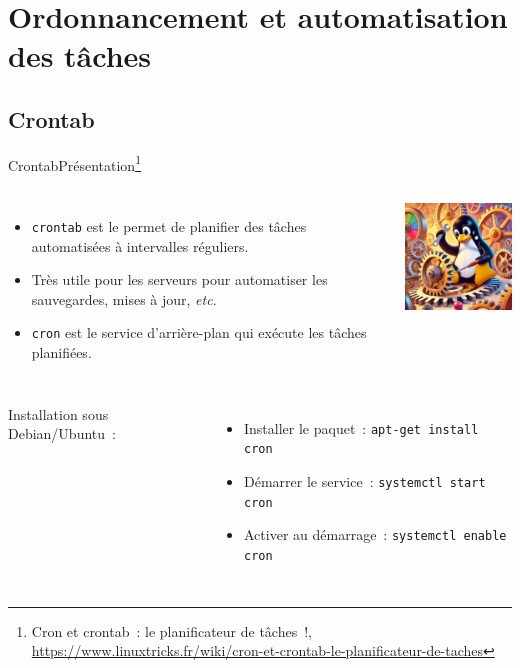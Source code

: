 \documentclass{beamer}
\begin{document}
    \section{Ordonnancement et automatisation des tâches}\label{sec:scheduling}

    \subsection{Crontab}\label{subsec:crontab}

    \begin{frame}{Crontab}{Présentation\footnote{\label{linuxtricks-cron}Cron et crontab~: le planificateur de tâches~!, \url{https://www.linuxtricks.fr/wiki/cron-et-crontab-le-planificateur-de-taches}}}
        \begin{columns}
            \begin{itemize}
                \item \lstinline{crontab} est le permet de planifier des tâches automatisées à intervalles réguliers.
                \item Très utile pour les serveurs pour automatiser les sauvegardes, mises à jour, \textit{etc}.
                \item \lstinline{cron} est le service d'arrière-plan qui exécute les tâches planifiées.
            \end{itemize}
            \includegraphics[width=4cm]{image/pinguin-clockwork}
        \end{columns}
        \bigbreak
        \begin{columns}
            \column{\dimexpr\paperwidth-100pt}
            Installation sous Debian/Ubuntu~:
            \begin{itemize}
                \item Installer le paquet~: \lstinline{apt-get install cron}
                \item Démarrer le service~: \lstinline{systemctl start cron}
                \item Activer au démarrage~: \lstinline{systemctl enable cron}
            \end{itemize}
        \end{columns}
    \end{frame}
\end{document}
